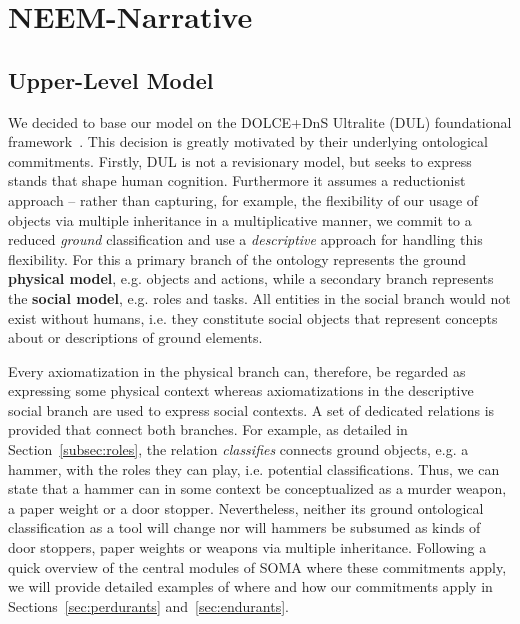 \section{NEEM-Narrative}
\label{ch:narrative}

\subsection{Upper-Level Model}
\label{sec:narrative:commitments}

We decided to base our model on the DOLCE+DnS Ultralite (DUL) foundational framework~\cite{DOLCE2003}.
This decision is greatly motivated by their underlying ontological commitments.
Firstly, DUL is not a revisionary model, but seeks to express stands that shape human cognition. Furthermore it assumes a reductionist approach -- rather than capturing, for example, the flexibility of our usage of objects via multiple inheritance in a multiplicative manner, we commit to a reduced {\it ground} classification and use a {\it descriptive} approach for handling this flexibility. For this a primary branch of the ontology represents the ground {\bf physical model}, e.g. objects and actions, while a secondary branch represents the {\bf social model}, e.g. roles and tasks. All entities in the social branch would not exist without humans, i.e. they constitute social objects that represent concepts about or descriptions of ground elements. 

Every axiomatization in the physical branch can, therefore, be regarded as expressing some physical context whereas axiomatizations in the descriptive social branch are used to express social contexts. A set of dedicated relations is provided that connect both branches. For example, as detailed in Section~\ref{subsec:roles}, the relation \emph{classifies} connects ground objects, e.g. a hammer, with the roles they can play, i.e. potential classifications. Thus, we can state that a hammer can in some context be conceptualized as a murder weapon, a paper weight or a door stopper. Nevertheless, neither its ground ontological classification as a tool will change nor will hammers be subsumed as kinds of door stoppers, paper weights or weapons via multiple inheritance. Following a quick overview of the central modules of SOMA where these commitments apply, we will provide detailed examples of where and how our commitments apply in Sections~\ref{sec:perdurants} and~\ref{sec:endurants}.


